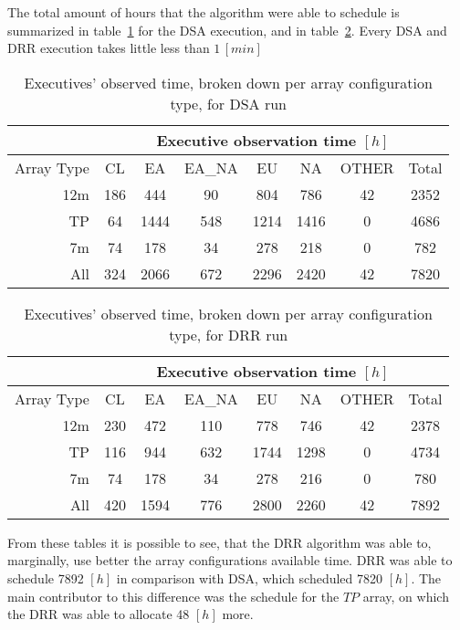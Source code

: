 The total amount of hours that the algorithm were able to schedule is summarized in table~\ref{table:dsa-hours-per-array} for the DSA execution, and in table~\ref{table:drr-hours-per-array}. Every DSA and DRR execution takes little less than $1\,[min]$

\begin{table}[t]
\centering
\begin{tabular}{c|c|c|c|c|c|c|c|} 
\cline{2-8}
 & \multicolumn{7}{c|}{Executive observation time $[h]$} \\ \hline
\multicolumn{1}{|r|}{Array Type} & CL	& EA & EA\_NA &	EU & NA & OTHER & Total \\ \hline
\multicolumn{1}{|r|}{12m} & 186 & 444 & 90 & 804 & 786 & 42 & 2352 \\ \hline
\multicolumn{1}{|r|}{TP} & 64 & 1444 & 548 & 1214 & 1416 & 0 & 4686 \\ \hline
\multicolumn{1}{|r|}{7m} & 74 & 178 & 34 & 278 & 218 & 0 & 782 \\ \hline
\multicolumn{1}{|r|}{All} & 324 & 2066 & 672 & 2296 & 2420 & 42 & 7820 \\ \hline
\end{tabular}
\caption{Executives' observed time, broken down per array configuration type, for DSA run}
\label{table:dsa-hours-per-array}
\end{table}

\begin{table}[t]
\centering
\begin{tabular}{c|c|c|c|c|c|c|c|} 
\cline{2-8}
 & \multicolumn{7}{c|}{Executive observation time $[h]$} \\ \hline
 \multicolumn{1}{|r|}{Array Type} & CL	& EA & EA\_NA &	EU & NA & OTHER & Total \\ \hline
 \multicolumn{1}{|r|}{12m} &	230 & 	472 &	110 &	778 & 	746 &	42 & 2378 \\ \hline
 \multicolumn{1}{|r|}{TP} & 116 & 944 & 632 &	1744 &	1298 & 	0 &	4734 \\ \hline
 \multicolumn{1}{|r|}{7m} & 74	& 178 & 34 & 278 & 216 & 0 & 780 \\ \hline
 \multicolumn{1}{|r|}{All} & 420 & 1594 & 776 & 2800 & 2260 & 42 & 7892 \\ \hline
\end{tabular}
\caption{Executives' observed time, broken down per array configuration type, for DRR run}
\label{table:drr-hours-per-array}
\end{table}

From these tables it is possible to see, that the DRR algorithm was able to, marginally, use better the array configurations available time. DRR was able to schedule 7892 $[h]$ in comparison with DSA, which scheduled 7820 $[h]$. The main contributor to this difference was the schedule for the $TP$ array, on which the DRR was able to allocate 48 $[h]$ more. 

